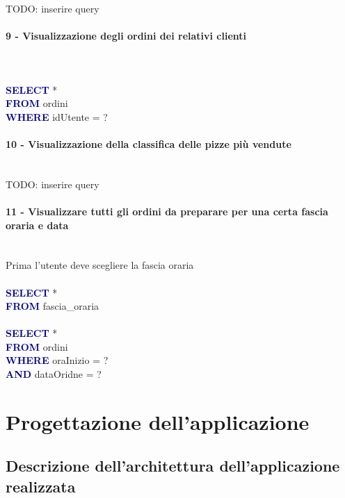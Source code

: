 \documentclass[a4paper,12pt, oneside]{article}
\begin{document}
TODO: inserire query

\paragraph{9 - Visualizzazione degli ordini dei relativi clienti}
\hphantom{A}\\    %
\\
\textcolor{darkBlue}{\textbf{SELECT}} *
\\\textcolor{darkBlue}{\textbf{FROM}} ordini
\\\textcolor{darkBlue}{\textbf{WHERE}} idUtente = ?

\paragraph{10 - Visualizzazione della classifica delle pizze più vendute}
\hphantom{A}\\    %
TODO: inserire query

\paragraph{11 - Visualizzare tutti gli ordini da preparare per una certa fascia oraria e data}
\hphantom{A}\\    %
Prima l'utente deve scegliere la fascia oraria
\\\\
\textcolor{darkBlue}{\textbf{SELECT}} *
\\\textcolor{darkBlue}{\textbf{FROM}} fascia\_oraria
\\\\
\textcolor{darkBlue}{\textbf{SELECT}} *
\\\textcolor{darkBlue}{\textbf{FROM}} ordini
\\\textcolor{darkBlue}{\textbf{WHERE}} oraInizio = ?
\\\textcolor{darkBlue}{\textbf{AND}} dataOridne = ?


\section{Progettazione dell'applicazione}
\subsection{Descrizione dell'architettura dell'applicazione realizzata}
\end{document}
